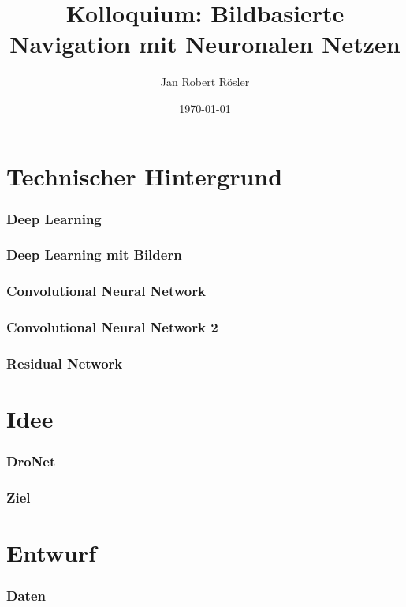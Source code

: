 \documentclass{beamer}
\title{Kolloquium: Bildbasierte Navigation mit Neuronalen Netzen}
\author{Jan Robert Rösler}
\date{\today}
\begin{document}
\maketitle



\section{Technischer Hintergrund}

\frame{\tableofcontents[currentsection]}

\begin{frame} 
  \frametitle{Deep Learning} 

\end{frame}

\begin{frame}
\frametitle{Deep Learning mit Bildern}



\end{frame}

\begin{frame}
\frametitle{Convolutional Neural Network}

\end{frame}

\begin{frame}
\frametitle{Convolutional Neural Network 2}

\end{frame}

\begin{frame}
\frametitle{Residual Network}

\end{frame}

\section{Idee}

\begin{frame}
\frametitle{DroNet}

\end{frame}

\begin{frame}
\frametitle{Ziel}

\end{frame}


\section{Entwurf}

\begin{frame}
\frametitle{Daten}

\end{frame}
\end{document}
